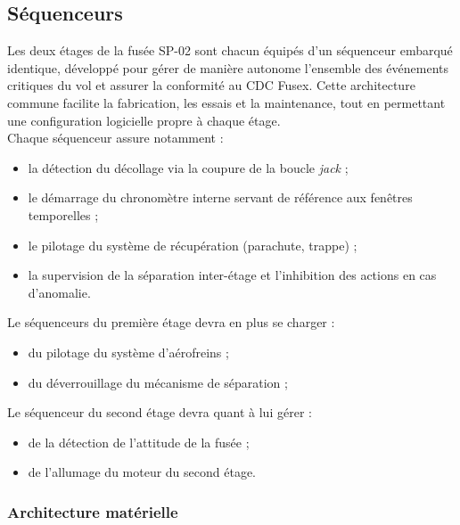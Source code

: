 \subsection{Séquenceurs}

Les deux étages de la fusée SP-02 sont chacun équipés d’un séquenceur embarqué identique, développé pour gérer de manière
autonome l’ensemble des événements critiques du vol et assurer la conformité au \acrshort{CDC} Fusex. Cette architecture
commune facilite la fabrication, les essais et la maintenance, tout en permettant une configuration logicielle propre à chaque
étage.\\


Chaque séquenceur assure notamment :
\begin{itemize}
    \item la détection du décollage via la coupure de la boucle \textit{jack} ;
    \item le démarrage du chronomètre interne servant de référence aux fenêtres temporelles ;
    \item le pilotage du système de récupération (parachute, trappe) ;
    \item la supervision de la séparation inter-étage et l’inhibition des actions en cas d’anomalie.
\end{itemize}

Le séquenceurs du première étage devra en plus se charger :
\begin{itemize}
    \item du pilotage du système d'aérofreins ;
    \item du déverrouillage du mécanisme de séparation ;
\end{itemize}

Le séquenceur du second étage devra quant à lui gérer :
\begin{itemize}
    \item de la détection de l'attitude de la fusée ;
    \item de l'allumage du moteur du second étage.
\end{itemize}

\subsubsection{Architecture matérielle}

